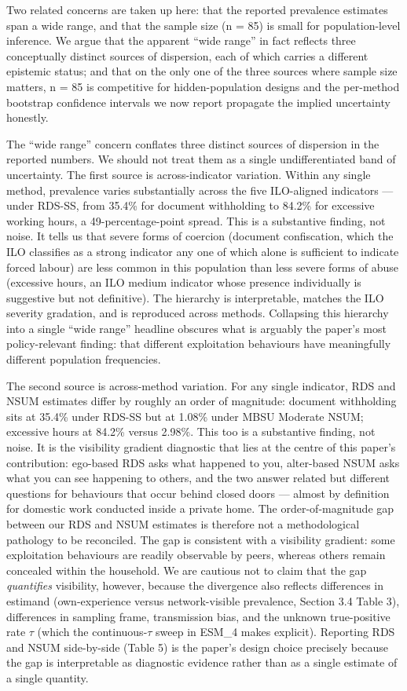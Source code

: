 \documentclass[
  12pt,
  letterpaper,
  DIV=11,
  numbers=noendperiod]{scrartcl}
\begin{document}
Two related concerns are taken up here: that the reported prevalence
estimates span a wide range, and that the sample size (n = 85) is small
for population-level inference. We argue that the apparent ``wide
range'' in fact reflects three conceptually distinct sources of
dispersion, each of which carries a different epistemic status; and that
on the only one of the three sources where sample size matters, n = 85
is competitive for hidden-population designs and the per-method
bootstrap confidence intervals we now report propagate the implied
uncertainty honestly.

The ``wide range'' concern conflates three distinct sources of
dispersion in the reported numbers. We should not treat them as a single
undifferentiated band of uncertainty. The first source is
across-indicator variation. Within any single method, prevalence varies
substantially across the five ILO-aligned indicators --- under RDS-SS,
from 35.4\% for document withholding to 84.2\% for excessive working
hours, a 49-percentage-point spread. This is a substantive finding, not
noise. It tells us that severe forms of coercion (document confiscation,
which the ILO classifies as a strong indicator any one of which alone is
sufficient to indicate forced labour) are less common in this population
than less severe forms of abuse (excessive hours, an ILO medium
indicator whose presence individually is suggestive but not definitive).
The hierarchy is interpretable, matches the ILO severity gradation, and
is reproduced across methods. Collapsing this hierarchy into a single
``wide range'' headline obscures what is arguably the paper's most
policy-relevant finding: that different exploitation behaviours have
meaningfully different population frequencies.

The second source is across-method variation. For any single indicator,
RDS and NSUM estimates differ by roughly an order of magnitude: document
withholding sits at 35.4\% under RDS-SS but at 1.08\% under MBSU
Moderate NSUM; excessive hours at 84.2\% versus 2.98\%. This too is a
substantive finding, not noise. It is the visibility gradient diagnostic
that lies at the centre of this paper's contribution: ego-based RDS asks
what happened to you, alter-based NSUM asks what you can see happening
to others, and the two answer related but different questions for
behaviours that occur behind closed doors --- almost by definition for
domestic work conducted inside a private home. The order-of-magnitude
gap between our RDS and NSUM estimates is therefore not a methodological
pathology to be reconciled. The gap is consistent with a visibility
gradient: some exploitation behaviours are readily observable by peers,
whereas others remain concealed within the household. We are cautious
not to claim that the gap \emph{quantifies} visibility, however, because
the divergence also reflects differences in estimand (own-experience
versus network-visible prevalence, Section 3.4 Table 3), differences in
sampling frame, transmission bias, and the unknown true-positive rate
\(\tau\) (which the continuous-\(\tau\) sweep in ESM\_4 makes explicit).
Reporting RDS and NSUM side-by-side (Table 5) is the paper's design
choice precisely because the gap is interpretable as diagnostic evidence
rather than as a single estimate of a single quantity.
\end{document}

